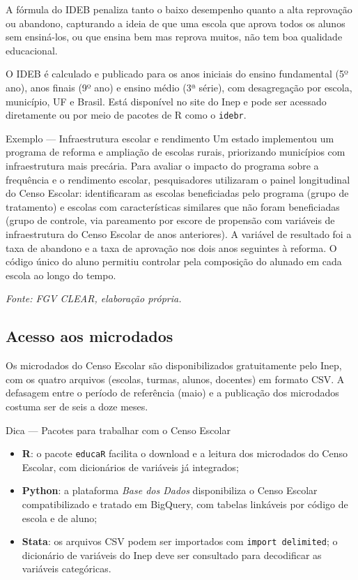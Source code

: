 A fórmula do IDEB penaliza tanto o baixo desempenho quanto a alta reprovação ou abandono, capturando a ideia de que uma escola que aprova todos os alunos sem ensiná-los, ou que ensina bem mas reprova muitos, não tem boa qualidade educacional.

O IDEB é calculado e publicado para os anos iniciais do ensino fundamental (5º ano), anos finais (9º ano) e ensino médio (3ª série), com desagregação por escola, município, UF e Brasil. Está disponível no site do Inep e pode ser acessado diretamente ou por meio de pacotes de R como o \texttt{idebr}.

\begin{boxexemplo}{Exemplo — Infraestrutura escolar e rendimento}
Um estado implementou um programa de reforma e ampliação de escolas rurais, priorizando municípios com infraestrutura mais precária. Para avaliar o impacto do programa sobre a frequência e o rendimento escolar, pesquisadores utilizaram o painel longitudinal do Censo Escolar: identificaram as escolas beneficiadas pelo programa (grupo de tratamento) e escolas com características similares que não foram beneficiadas (grupo de controle, via pareamento por escore de propensão com variáveis de infraestrutura do Censo Escolar de anos anteriores). A variável de resultado foi a taxa de abandono e a taxa de aprovação nos dois anos seguintes à reforma. O código único do aluno permitiu controlar pela composição do alunado em cada escola ao longo do tempo.

\textit{Fonte: FGV CLEAR, elaboração própria.}
\end{boxexemplo}

\subsection{Acesso aos microdados}

Os microdados do Censo Escolar são disponibilizados gratuitamente pelo Inep, com os quatro arquivos (escolas, turmas, alunos, docentes) em formato CSV. A defasagem entre o período de referência (maio) e a publicação dos microdados costuma ser de seis a doze meses.

\begin{boxdica}{Dica — Pacotes para trabalhar com o Censo Escolar}
\begin{itemize}
  \item \textbf{R}: o pacote \texttt{educaR} facilita o download e a leitura dos microdados do Censo Escolar, com dicionários de variáveis já integrados;
  \item \textbf{Python}: a plataforma \textit{Base dos Dados} disponibiliza o Censo Escolar compatibilizado e tratado em BigQuery, com tabelas linkáveis por código de escola e de aluno;
  \item \textbf{Stata}: os arquivos CSV podem ser importados com \texttt{import delimited}; o dicionário de variáveis do Inep deve ser consultado para decodificar as variáveis categóricas.
\end{itemize}
\end{boxdica}

